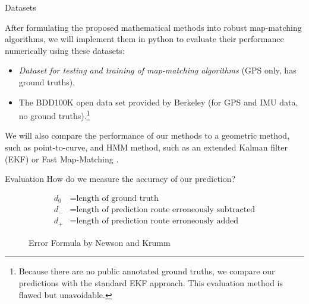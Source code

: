 \documentclass[aspectratio=169, bigfiles]{beamer}
\begin{document}
\begin{frame}{Datasets}
    
After formulating the proposed  mathematical methods into robust map-matching algorithms, we will implement them in python to evaluate their performance numerically using these datasets:
\begin{itemize}
    \item \textit{Dataset for testing and training of map-matching algorithms} \cite{KCMMN} (GPS only, has ground truths),
    \item The BDD100K open data set provided by Berkeley \cite{yuBDD100KDiverseDriving2020} (for GPS and IMU data, no ground truths).\footnote{Because there are no public annotated ground truths, we compare our predictions with the standard EKF approach. This evaluation method is flawed but unavoidable.} %
\end{itemize}
We will also compare the performance of our methods to a geometric method, such as point-to-curve, and HMM method, such as an extended Kalman filter (EKF) or Fast Map-Matching \cite{YG}.
    
\end{frame}

\begin{frame}{Evaluation}
    How do we measure the accuracy of our prediction? 
    
    \vspace{-2.5mm}
    \begin{figure}[ht]
    \centering
    \def\svgwidth{\linewidth}
    {\footnotesize
    }
    \footnotesize
    \begin{align*} 
	    d_0 &= \text{length of ground truth} \\
	    d_- &= \text{length of prediction route erroneously subtracted} \\
	    d_{+} &= \text{length of prediction route erroneously added}
    \end{align*}
    \normalsize
    \caption{Error Formula by Newson and Krumm}
    \label{fig:error-formula}
\end{figure}
    
\end{frame}
\end{document}
